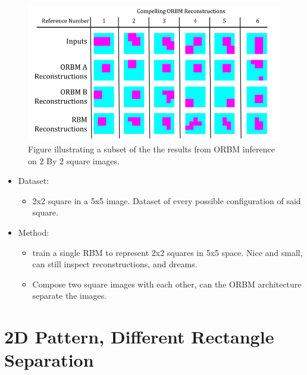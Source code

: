 \begin{figure}[htb]
  \begin{center}
    \includegraphics[width=\textwidth]{Assets/results/sq-orbm-results.png}
  \end{center}
  \caption{Figure illustrating a subset of the the results from ORBM inference on 2 By 2 square images.}
  \label{F:sq-orbm-results}
\end{figure}



\begin{itemize}
    \item Dataset:
    \begin{itemize}
      \item 2x2 square in a 5x5 image. Dataset of every possible configuration of said square.
    \end{itemize}
    \item Method:
    \begin{itemize}
      \item train a single RBM to represent 2x2 squares in 5x5 space. Nice and small, can still inspect reconstructions, and dreams.
      \item Compose two square images with each other, can the ORBM architecture separate the images.
    \end{itemize}
  \end{itemize}

    \section{2D Pattern, Different Rectangle Separation}

